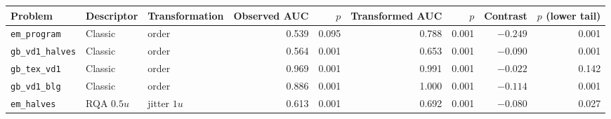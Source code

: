 \begin{tabular}{lllrrrrrr}
\toprule
Problem & Descriptor & Transformation & Observed AUC & $p$ & Transformed AUC & $p$ & Contrast & $p$ (lower tail) \\
\midrule
\texttt{em\_program} & Classic & order & 0.539 & 0.095 & 0.788 & 0.001 & $-0.249$ & 0.001 \\
\texttt{gb\_vd1\_halves} & Classic & order & 0.564 & 0.001 & 0.653 & 0.001 & $-0.090$ & 0.001 \\
\texttt{gb\_tex\_vd1} & Classic & order & 0.969 & 0.001 & 0.991 & 0.001 & $-0.022$ & 0.142 \\
\texttt{gb\_vd1\_blg} & Classic & order & 0.886 & 0.001 & 1.000 & 0.001 & $-0.114$ & 0.001 \\
\texttt{em\_halves} & RQA $0.5u$ & jitter $1u$ & 0.613 & 0.001 & 0.692 & 0.001 & $-0.080$ & 0.027 \\
\bottomrule
\end{tabular}
